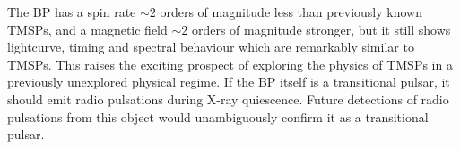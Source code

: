 
\par The BP has a spin rate $\sim2$ orders of magnitude less than previously known TMSPs, and a magnetic field $\sim2$ orders of magnitude stronger, but it still shows lightcurve, timing and spectral behaviour which are remarkably similar to TMSPs. This raises the exciting prospect of exploring the physics of TMSPs in a previously unexplored physical regime. If the BP itself is a transitional pulsar, it should emit radio pulsations during X-ray quiescence. Future detections of radio pulsations from this object would unambiguously confirm it as a transitional pulsar.

